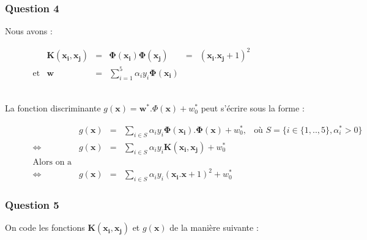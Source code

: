 \documentclass[a4paper, 10pt]{article}
\begin{document}
\subsubsection*{Question 4}

Nous avons :
\begin{figure}[h!]
 \centering
$
    \begin{array}{rrllll}
	&\mathbf{K(x_{i},x_{j})} &=& \mathbf{\Phi(x_{i})\Phi(x_{j})} & = & (\mathbf{x_{i}}.\mathbf{x_{j}} + 1)^{2} \\
	\mbox{et} &\mathbf{w} & = &\sum^{5}_{i=1}\alpha_{i}y_{i}\mathbf{\Phi(x_{i})} & &
      \end{array}
 $
\end{figure}\\
La fonction discriminante $g(\mathbf{x}) = \mathbf{w^{*}}.\Phi(\mathbf{x})+w_{0}^{*}$ peut s'écrire sous la forme :

\begin{figure}[h!]
 \centering
$
\begin{array}{rrlll}
& g(\mathbf{x}) &=& \sum_{i \in S}\alpha_{i}y_{i}\mathbf{\Phi(x_{i})}.\mathbf{\Phi(\mathbf{x})}+w_{0}^{*},  &
\mbox{où } S = \{i \in \{1, .. , 5\}, \alpha^{*}_{i} > 0\}\\
\Longleftrightarrow & g(\mathbf{x}) & = & \sum_{i \in S}\alpha_{i}y_{i}\mathbf{K(x_{i},x_{j})} +w_{0}^{*} &\\
\mbox{Alors on a finalement :}  &  &  & &\\
\Longleftrightarrow & g(\mathbf{x}) &= & \sum_{i \in S}\alpha_{i}y_{i}(\mathbf{x_{i}}.\mathbf{x} + 1)^{2} +w_{0}^{*} &
\end{array}
$
\end{figure}

\subsubsection*{Question 5}

On code les fonctions $\mathbf{K(x_{i},x_{j})}$ et $g(\mathbf{x})$ de la manière suivante :

\end{document}
